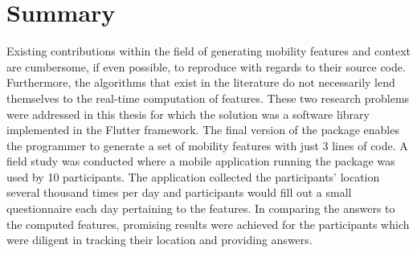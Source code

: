\chapter{Summary}
Existing contributions within the field of generating mobility features and context are cumbersome, if even possible, to reproduce with regards to their source code. Furthermore, the algorithms that exist in the literature do not necessarily lend themselves to the real-time computation of features. These two research problems were addressed in this thesis for which the solution was a software library implemented in the Flutter framework. The final version of the package enables the programmer to generate a set of mobility features with just 3 lines of code. A field study was conducted where a mobile application running the package was used by 10 participants. The application collected the participants' location several thousand times per day and participants would fill out a small questionnaire each day pertaining to the features. In comparing the answers to the computed features, promising results were achieved for the participants which were diligent in tracking their location and providing answers. 